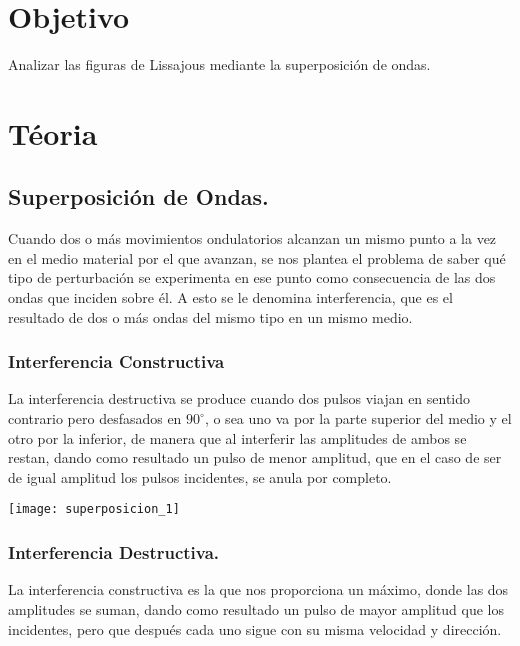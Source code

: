\documentclass[11pt]{article}
\newenvironment{Figuras}
  {\par\medskip\noindent\minipage{\linewidth}}
  {\endminipage\par\medskip}
\begin{document}
\begin{multicols}{2}

\section{Objetivo}
	Analizar las figuras de Lissajous mediante la superposición de ondas.
\section{Téoria}
		
		\subsection{Superposición de Ondas.}
Cuando dos o más movimientos ondulatorios alcanzan un mismo punto a la vez en el medio material por el que avanzan, se nos plantea el problema de saber qué tipo de perturbación se experimenta en ese punto como consecuencia de las dos ondas que inciden sobre él. A esto se le denomina interferencia, que es el resultado de dos o más ondas del mismo tipo en un mismo medio.

			\subsubsection{Interferencia Constructiva}

La interferencia destructiva se produce cuando dos pulsos viajan en sentido contrario pero desfasados en $90^{\circ}$, o sea uno va por la parte superior del medio y el otro por la inferior, de manera que al interferir las amplitudes de ambos se restan, dando como resultado un pulso de menor amplitud, que en el caso de ser de igual amplitud los pulsos incidentes, se anula por completo.

\begin{Figuras}
	\centering
    \texttt{[image: superposicion\_1]}
    \label{fig:mesh1}
\end{Figuras}

			\subsubsection{Interferencia Destructiva.}

La interferencia constructiva es la que nos proporciona un máximo, donde las dos amplitudes se suman, dando como resultado un pulso de mayor amplitud que los incidentes, pero que después cada uno sigue con su misma velocidad y dirección.


\end{multicols}
\end{document}
